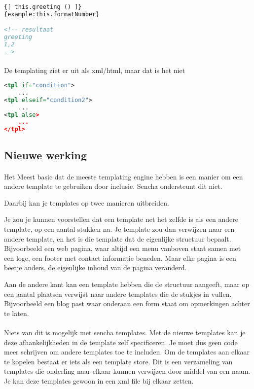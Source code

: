 \begin{lstlisting}[language=xml]
{[ this.greeting () ]}
{example:this.formatNumber}

<!-- resultaat
greeting
1,2
-->
\end{lstlisting}

\paragraph {} De templating ziet er uit als xml/html, maar dat is het niet

\begin{lstlisting}[language=xml]
<tpl if="condition">
	...
<tpl elseif="condition2">
	...
<tpl alse>
	...
</tpl>
\end{lstlisting}


\subsection {Nieuwe werking}

\paragraph {}Het Meest basic dat de meeste templating engine hebben is een manier om een
andere template te gebruiken door inclusie. Sencha ondersteunt dit niet.

Daarbij kan je templates op twee manieren uitbreiden.

Je zou je kunnen voorstellen dat een
template net het zelfde is als een andere template, op een aantal stukken na. Je template
zou dan verwijzen naar een andere template, en het is die template dat de eigenlijke
structuur bepaalt. Bijvoorbeeld een web pagina, waar altijd een menu vanboven staat samen
met een loge, een footer met contact informatie beneden. Maar elke pagina is een beetje
anders, de eigenlijke inhoud van de pagina veranderd.

Aan de andere kant kan een template hebben die de structuur aangeeft, maar op een aantal
plaatsen verwijst naar andere templates die de stukjes in vullen. Bijvoorbeeld een blog
past waar onderaan een form staat om opmerkingen achter te laten.

\paragraph {} Niets van dit is mogelijk met sencha templates. Met de nieuwe templates kan
je deze afhankelijkheden in de template zelf specificeren. Je moet dus geen code meer
schrijven om andere templates toe te includen. Om de templates aan elkaar te kopelen
bestaat er iets als een template store. Dit is een verzameling van templates die onderling
naar elkaar kunnen verwijzen door middel van een naam. Je kan deze templates gewoon in een
xml file bij elkaar zetten.

